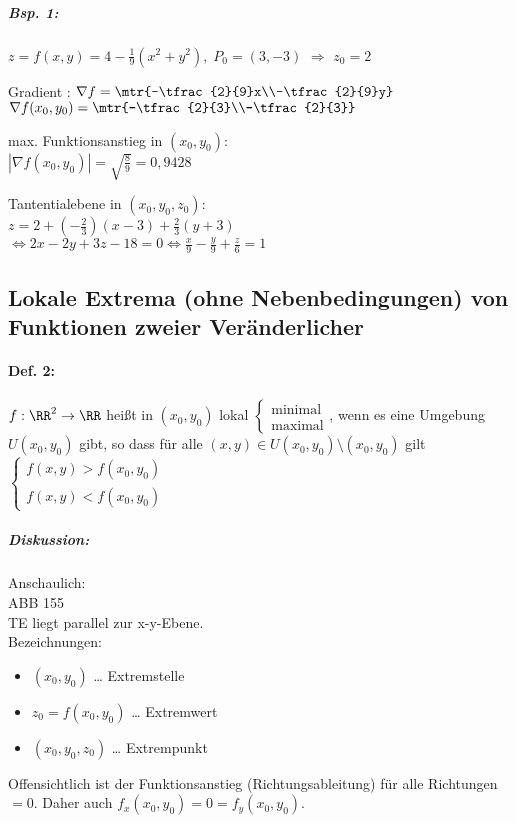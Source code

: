 \subparagraph{Bsp. 1:} $z=f(x,y)=4-\frac{1}{9}(x^2+y^2), \; P_0=(3,-3)$ $\Rightarrow$ $z_0=2$
\begin{anumerate}
\item Gradient : $\nabla f = \mtr{-\tfrac{2}{9}x\\-\tfrac{2}{9}y}$\\
$\nabla f(x_0,y_0)=\mtr{-\tfrac{2}{3}\\-\tfrac{2}{3}}$
\item max. Funktionsanstieg in $(x_0,y_0)$:\\
$|\nabla f(x_0,y_0)|=\sqrt{\tfrac{8}{9}}=0,9428$
\item Tantentialebene in $(x_0,y_0,z_0)$:\\
$z=2+(-\tfrac{2}{3})(x-3)+\tfrac{2}{3}(y+3)$\\
$\Leftrightarrow 2x-2y+3z-18=0 \Leftrightarrow \frac{x}{9}-\frac{y}{9}+\frac{z}{6}=1$
\end{anumerate}

\subsection{Lokale Extrema (ohne Nebenbedingungen) von Funktionen zweier Veränderlicher}
\paragraph{Def. 2:} $f: \RR^2\to \RR$ heißt in $(x_0,y_0)$ lokal $\begin{cases}
\text{minimal}\\
\text{maximal}
\end{cases}$, wenn es eine Umgebung $U(x_0,y_0)$ gibt, so dass für alle $(x,y)\in U(x_0,y_0)\setminus (x_0,y_0)$ gilt $\begin{cases}
f(x,y) > f(x_0,y_0)\\
f(x,y) < f(x_0,y_0)
\end{cases}$
\subparagraph{Diskussion:} Anschaulich:\\
ABB 155\\
TE liegt parallel zur x-y-Ebene.\\
Bezeichnungen: 
\begin{itemize}
\item $(x_0,y_0)$ … Extremstelle
\item $z_0=f(x_0,y_0)$ … Extremwert
\item $(x_0,y_0,z_0)$ … Extrempunkt
\end{itemize}
Offensichtlich ist der Funktionsanstieg (Richtungsableitung) für alle Richtungen $=0$. Daher auch $f_x(x_0,y_0)=0=f_y(x_0,y_0)$.
